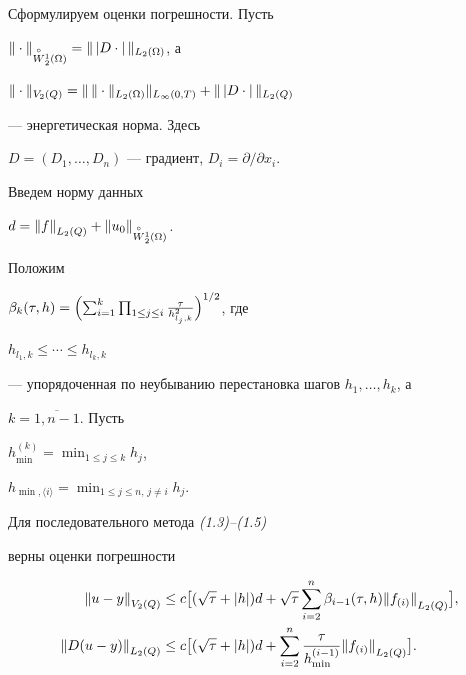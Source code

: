 Сформулируем оценки погрешности. Пусть


$\norma_{\overset{\circ}{W}{}^1_2(\Omega)}=\ver\,


\vert D\cdot\vert\,\ver_{L_2(\Omega)}$, а


$\norma_{V_2(Q)}=


\ver\,\|\cdot\nolinebreak\|_{L_2(\Omega)}\ver_{L_{\infty}(0,T)}+


\ver\,\vert D\cdot\vert\,\ver_{L_2(Q)}$


--- энергетическая норма. Здесь


$D=(D_1,\dotsc,D_n)$ --- градиент, $D_i=\partial/\partial x_i$.


Введем норму данных 


$d={\| f\|}_{L_2(Q)}+{\| u_0\|}_{\overset{\circ}{W}{}_{2}^1(\Omega)}$.





Положим 


$\beta_k(\tau, h)={\Bigl(\sum_{i=1}^k\prod_{1\le j\le i}


\tfrac{\tau}{h_{l_j,k}^2}\Bigr)}^{1/2}$, где


$h_{l_1,k}\le \dotsb\le h_{l_k,k}$


--- упорядоченная по неубыванию перестановка шагов $h_1,\dotsc,h_k$, а


$k=\overline{1,n-1}$. Пусть


$h_{\min}^{(k)}={\min}_{1\le j\le k}h_j$,


$h_{\min,\langle i\rangle}={\min}_{1\le j\le n,\,j\ne i}h_j$. 





\begin{thm} Для последовательного метода {\em (1.3)--(1.5)}


верны оценки погрешности


\begin{align}


{\ver u-y\ver}_{V_2(Q)} &\le c\bigl[(\po)d+


\sqrt\tau\sum_{i=2}^n\beta_{i-1}(\tau,h)


{\ver f_{(i)}\ver}_{L_2(Q)}\bigr],\\


%


{\ver D(u-y)\ver}_{L_2(Q)} &\le c\bigl[(\po)d+


\sum_{i=2}^n\frac{\tau}{h_{\min}^{(i-1)}}


{\ver f_{(i)}\ver}_{L_2(Q)}\bigr].


\end{align}


\end{thm}






